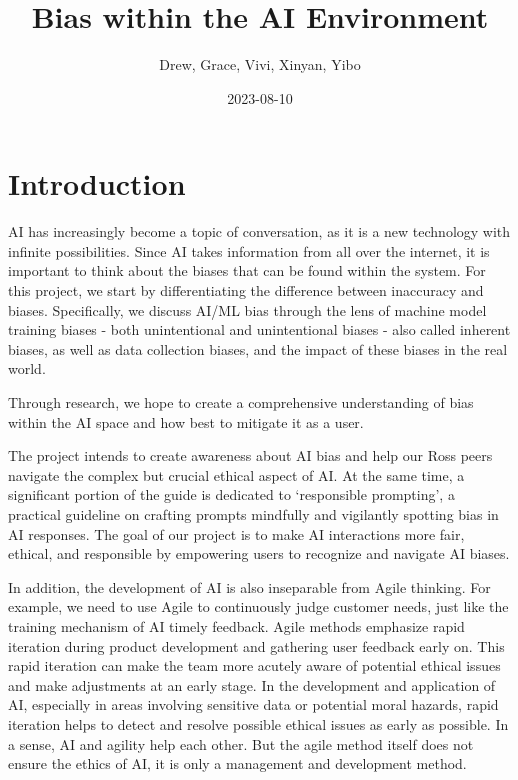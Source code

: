 \documentclass[
]{book}
\title{Bias within the AI Environment}
\author{Drew, Grace, Vivi, Xinyan, Yibo}
\date{2023-08-10}
\begin{document}
\maketitle

{
\setcounter{tocdepth}{1}
\tableofcontents
}
\hypertarget{introduction}{%
\chapter{Introduction}\label{introduction}}

AI has increasingly become a topic of conversation, as it is a new technology with infinite possibilities. Since AI takes information from all over the internet, it is important to think about the biases that can be found within the system. For this project, we start by differentiating the difference between inaccuracy and biases. Specifically, we discuss AI/ML bias through the lens of machine model training biases - both unintentional and unintentional biases - also called inherent biases, as well as data collection biases, and the impact of these biases in the real world.

Through research, we hope to create a comprehensive understanding of bias within the AI space and how best to mitigate it as a user.

The project intends to create awareness about AI bias and help our Ross peers navigate the complex but crucial ethical aspect of AI. At the same time, a significant portion of the guide is dedicated to `responsible prompting', a practical guideline on crafting prompts mindfully and vigilantly spotting bias in AI responses. The goal of our project is to make AI interactions more fair, ethical, and responsible by empowering users to recognize and navigate AI biases.

In addition, the development of AI is also inseparable from Agile thinking. For example, we need to use Agile to continuously judge customer needs, just like the training mechanism of AI timely feedback. Agile methods emphasize rapid iteration during product development and gathering user feedback early on. This rapid iteration can make the team more acutely aware of potential ethical issues and make adjustments at an early stage. In the development and application of AI, especially in areas involving sensitive data or potential moral hazards, rapid iteration helps to detect and resolve possible ethical issues as early as possible. In a sense, AI and agility help each other. But the agile method itself does not ensure the ethics of AI, it is only a management and development method.
\end{document}

